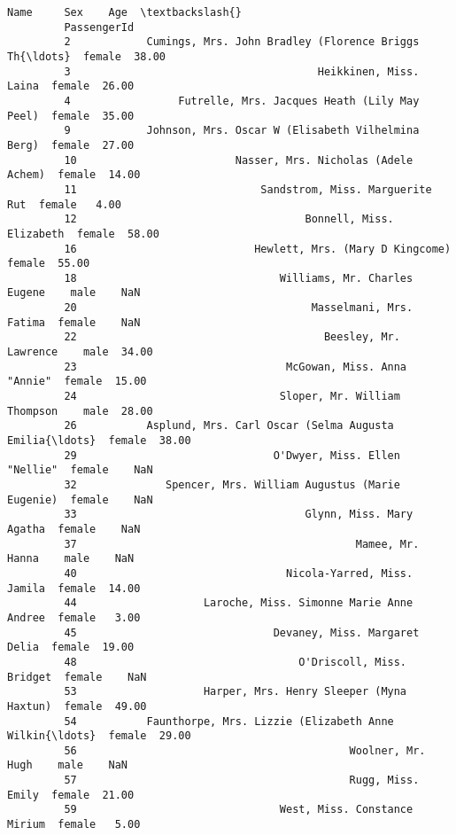 \documentclass[11pt]{article}
\begin{document}
\begin{Verbatim}[commandchars=\\\{\}]
                                                                   Name     Sex    Age  \textbackslash{}
         PassengerId                                                                     
         2            Cumings, Mrs. John Bradley (Florence Briggs Th{\ldots}  female  38.00   
         3                                       Heikkinen, Miss. Laina  female  26.00   
         4                 Futrelle, Mrs. Jacques Heath (Lily May Peel)  female  35.00   
         9            Johnson, Mrs. Oscar W (Elisabeth Vilhelmina Berg)  female  27.00   
         10                         Nasser, Mrs. Nicholas (Adele Achem)  female  14.00   
         11                             Sandstrom, Miss. Marguerite Rut  female   4.00   
         12                                    Bonnell, Miss. Elizabeth  female  58.00   
         16                            Hewlett, Mrs. (Mary D Kingcome)   female  55.00   
         18                                Williams, Mr. Charles Eugene    male    NaN   
         20                                     Masselmani, Mrs. Fatima  female    NaN   
         22                                       Beesley, Mr. Lawrence    male  34.00   
         23                                 McGowan, Miss. Anna "Annie"  female  15.00   
         24                                Sloper, Mr. William Thompson    male  28.00   
         26           Asplund, Mrs. Carl Oscar (Selma Augusta Emilia{\ldots}  female  38.00   
         29                               O'Dwyer, Miss. Ellen "Nellie"  female    NaN   
         32              Spencer, Mrs. William Augustus (Marie Eugenie)  female    NaN   
         33                                    Glynn, Miss. Mary Agatha  female    NaN   
         37                                            Mamee, Mr. Hanna    male    NaN   
         40                                 Nicola-Yarred, Miss. Jamila  female  14.00   
         44                    Laroche, Miss. Simonne Marie Anne Andree  female   3.00   
         45                               Devaney, Miss. Margaret Delia  female  19.00   
         48                                   O'Driscoll, Miss. Bridget  female    NaN   
         53                    Harper, Mrs. Henry Sleeper (Myna Haxtun)  female  49.00   
         54           Faunthorpe, Mrs. Lizzie (Elizabeth Anne Wilkin{\ldots}  female  29.00   
         56                                           Woolner, Mr. Hugh    male    NaN   
         57                                           Rugg, Miss. Emily  female  21.00   
         59                                West, Miss. Constance Mirium  female   5.00   

\end{Verbatim}
\end{document}
